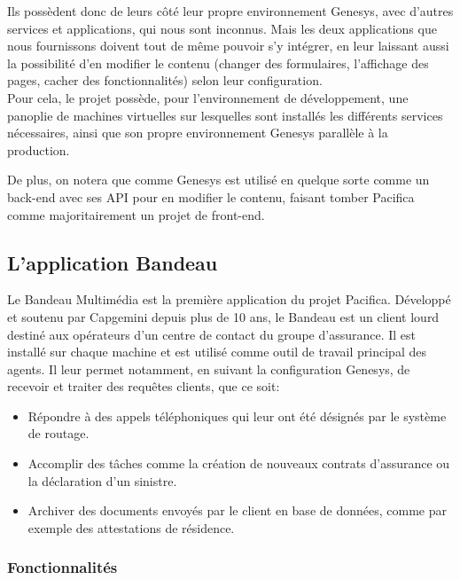 \documentclass{rapport}
\begin{document}
Ils possèdent donc de leurs côté leur propre environnement Genesys, avec d'autres services et applications, qui nous sont inconnus. Mais les deux applications que nous fournissons doivent tout de même pouvoir s'y intégrer, en leur laissant aussi la possibilité d'en modifier le contenu (changer des formulaires, l'affichage des pages, cacher des fonctionnalités) selon leur configuration.\\
Pour cela, le projet possède, pour l'environnement de développement, une panoplie de machines virtuelles sur lesquelles sont installés les différents services nécessaires, ainsi que son propre environnement Genesys parallèle à la production.

De plus, on notera que comme Genesys est utilisé en quelque sorte comme un back-end avec ses API pour en modifier le contenu, faisant tomber Pacifica comme majoritairement un projet de front-end.\\

\subsection{L'application Bandeau}

Le Bandeau Multimédia est la première application du projet Pacifica. Développé et soutenu par Capgemini depuis plus de 10 ans, le Bandeau est un client lourd destiné aux opérateurs d'un centre de contact du groupe d'assurance. Il est installé sur chaque machine et est utilisé comme outil de travail principal des agents. Il leur permet notamment, en suivant la configuration Genesys, de recevoir et traiter des requêtes clients, que ce soit:\\

\begin{itemize}
\item Répondre à des appels téléphoniques qui leur ont été désignés par le système de routage.
\item Accomplir des tâches comme la création de nouveaux contrats d'assurance ou la déclaration d'un sinistre.
\item Archiver des documents envoyés par le client en base de données, comme par exemple des attestations de résidence.
\end{itemize}

\subsubsection{Fonctionnalités}
\end{document}
